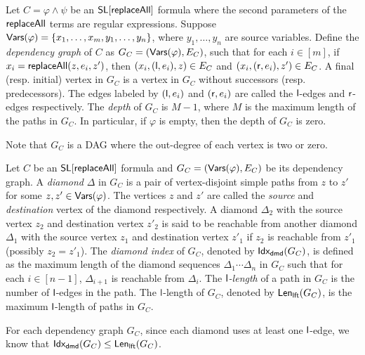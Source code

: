 \begin{definition}
	Let $C= \varphi \wedge \psi$ be an $\mathsf{SL}[\mathsf{replaceAll}]$ formula where the second parameters of the $\mathsf{replaceAll}$ terms are regular expressions. Suppose $\mathsf{Vars}(\varphi) = \{x_1,\dots, x_m, y_1, \dots, y_n\}$, where $y_1,\dots, y_n$ are  source variables. Define the \emph{dependency graph} of $C$ as $G_C= (\mathsf{Vars}(\varphi), E_C)$, such that for each $i \in [m]$, if $x_i = \mathsf{replaceAll}(z, e_i, z')$, then $(x_i, (\mathsf{l}, e_i), z) \in E_C$ and $(x_i, (\mathsf{r}, e_i), z') \in E_C$. A final (resp. initial) vertex in $G_C$ is a vertex in $G_C$ without successors (resp. predecessors). The edges labeled by $(\mathsf{l}, e_i)$ and $(\mathsf{r}, e_i)$ are called the $\mathsf{l}$-edges and $\mathsf{r}$-edges respectively. The \emph{depth} of $G_C$ is $M-1$, where $M$ is the maximum length of the paths in $G_C$. In particular, if $\varphi$ is empty, then the depth of $G_C$ is zero. 
\end{definition}
Note that $G_C$ is a DAG where the out-degree of each vertex is two or zero. 

\begin{definition}
Let $C$  be an  $\mathsf{SL}[\mathsf{replaceAll}]$ formula and $G_C=(\mathsf{Vars}(\varphi), E_C)$ be its dependency graph. A \emph{diamond} $\Delta$ in $G_C$ is a pair of vertex-disjoint simple paths from $z$ to $z'$ for some $z,z' \in \mathsf{Vars}(\varphi)$. The vertices $z$ and $z'$ are called the \emph{source} and \emph{destination} vertex of the diamond respectively. A diamond $\Delta_2$ with the source vertex $z_2$ and destination vertex $z'_2$ is said to be reachable from  another diamond $\Delta_1$ with the source vertex $z_1$ and destination vertex $z'_1$ if $z_2$ is reachable from $z'_1$ (possibly $z_2= z'_1$). The \emph{diamond index} of $G_C$, denoted by ${\sf Idx_{dmd}}(G_C)$, is defined as the maximum length of the diamond sequences $\Delta_1 \cdots \Delta_n$ in $G_C$ such that for each $i \in [n-1]$, $\Delta_{i+1}$ is reachable from $\Delta_i$. The \emph{$\mathsf{l}$-length} of a path in $G_C$ is the number of $\mathsf{l}$-edges in the path. The $\mathsf{l}$-length of $G_C$, denoted by ${\sf Len_{lft}}(G_C)$, is the maximum $\mathsf{l}$-length of paths in $G_C$.
\end{definition}
For each dependency graph $G_C$, since each diamond uses at least one $\mathsf{l}$-edge, we know that ${\sf Idx_{dmd}}(G_C) \le {\sf Len_{lft}}(G_C)$.

